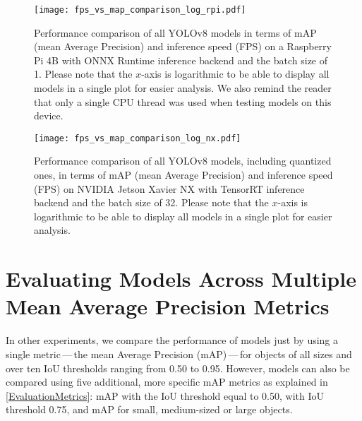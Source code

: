 \begin{figure}[H]
    \begin{framed}
        \centering
        \texttt{[image: fps\_vs\_map\_comparison\_log\_rpi.pdf]}
        \caption{Performance comparison of all YOLOv8 models in terms of mAP
        (mean Average Precision) and inference speed (FPS) on a Raspberry Pi 4B
        with ONNX Runtime inference backend and the batch size of 1. Please note
        that the $x$-axis is logarithmic to be able to display all models in a
        single plot for easier analysis. We also remind the reader that only a
        single CPU thread was used when testing models on this device.}
        \label{FPSvsmAPComparisonRPi}
    \end{framed}
\end{figure}

\begin{figure}[H]
    \begin{framed}
        \centering
        \texttt{[image: fps\_vs\_map\_comparison\_log\_nx.pdf]}
        \caption{Performance comparison of all YOLOv8 models, including
        quantized ones, in terms of mAP (mean Average Precision) and inference
        speed (FPS) on NVIDIA Jetson Xavier NX with TensorRT inference backend
        and the batch size of 32. Please note that the $x$-axis is logarithmic to
        be able to display all models in a single plot for easier analysis.}
        \label{FPSvsmAPComparisonNX}
    \end{framed}
\end{figure}








\section{Evaluating Models Across Multiple Mean Average Precision Metrics}


In other experiments, we compare the performance of models just by
using a single metric\,---\,the mean Average Precision (mAP)\,---\,for objects of all
sizes and over ten IoU thresholds ranging from \num{0.50} to \num{0.95}.
However, models can also be compared using five additional, more specific mAP
metrics as explained in \autoref{EvaluationMetrics}: mAP with the IoU
threshold equal to \num{0.50}, with IoU threshold \num{0.75}, and mAP for small,
medium-sized or large objects.

